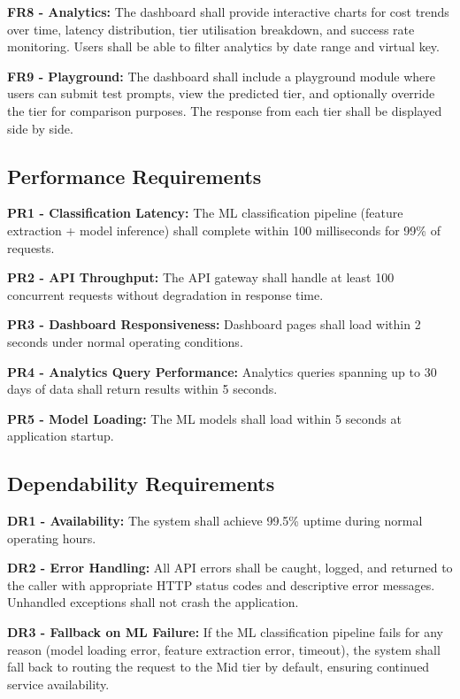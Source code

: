 \documentclass[oneside,12pt,a4paper]{report}
\begin{document}
\textbf{FR8 - Analytics:} The dashboard shall provide interactive charts for cost trends over time, latency distribution, tier utilisation breakdown, and success rate monitoring. Users shall be able to filter analytics by date range and virtual key.

\textbf{FR9 - Playground:} The dashboard shall include a playground module where users can submit test prompts, view the predicted tier, and optionally override the tier for comparison purposes. The response from each tier shall be displayed side by side.

\subsection{Performance Requirements}

\textbf{PR1 - Classification Latency:} The ML classification pipeline (feature extraction + model inference) shall complete within 100 milliseconds for 99\% of requests.

\textbf{PR2 - API Throughput:} The API gateway shall handle at least 100 concurrent requests without degradation in response time.

\textbf{PR3 - Dashboard Responsiveness:} Dashboard pages shall load within 2 seconds under normal operating conditions.

\textbf{PR4 - Analytics Query Performance:} Analytics queries spanning up to 30 days of data shall return results within 5 seconds.

\textbf{PR5 - Model Loading:} The ML models shall load within 5 seconds at application startup.

\subsection{Dependability Requirements}

\textbf{DR1 - Availability:} The system shall achieve 99.5\% uptime during normal operating hours.

\textbf{DR2 - Error Handling:} All API errors shall be caught, logged, and returned to the caller with appropriate HTTP status codes and descriptive error messages. Unhandled exceptions shall not crash the application.

\textbf{DR3 - Fallback on ML Failure:} If the ML classification pipeline fails for any reason (model loading error, feature extraction error, timeout), the system shall fall back to routing the request to the Mid tier by default, ensuring continued service availability.
\end{document}
